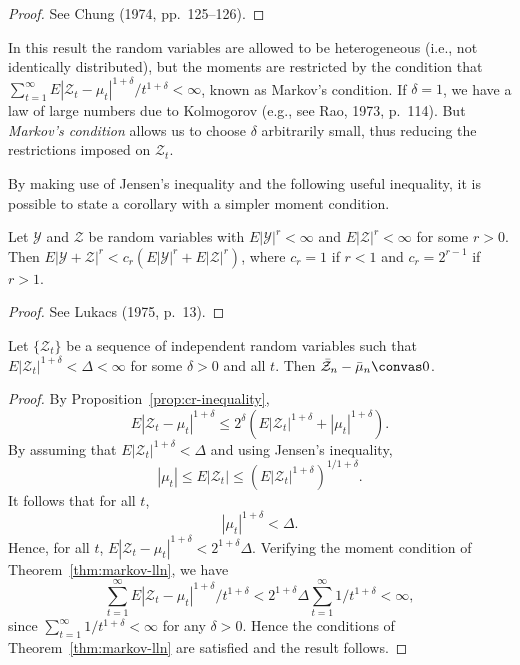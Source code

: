 \begin{proof}
See Chung (1974, pp.~125--126). \qedhere
\end{proof}

In this result the random variables are allowed to be heterogeneous (i.e., not identically distributed), but the moments are restricted by the condition that $\sum_{t=1}^{\infty} E|\mathcal{Z}_t - \mu_t|^{1+\delta}/t^{1+\delta} < \infty$, known as Markov's condition. If $\delta = 1$, we have a law of large numbers due to Kolmogorov (e.g., see Rao, 1973, p.~114). But \emph{Markov's condition} allows us to choose $\delta$ arbitrarily small, thus reducing the restrictions imposed on $\mathcal{Z}_t$.

By making use of Jensen's inequality and the following useful inequality, it is possible to state a corollary with a simpler moment condition.

\begin{proposition}\label{prop:cr-inequality}
Let $\mathcal{Y}$ and $\mathcal{Z}$ be random variables with $E|\mathcal{Y}|^r < \infty$ and $E|\mathcal{Z}|^r < \infty$ for some $r > 0$. Then $E|\mathcal{Y} + \mathcal{Z}|^r < c_r(E|\mathcal{Y}|^r + E|\mathcal{Z}|^r)$, where $c_r = 1$ if $r < 1$ and $c_r = 2^{r-1}$ if $r > 1$.
\end{proposition}

\begin{proof}
See Lukacs (1975, p.~13). \qedhere
\end{proof}

\begin{corollary}\label{cor:markov-simple}
Let $\{\mathcal{Z}_t\}$ be a sequence of independent random variables such that $E|\mathcal{Z}_t|^{1+\delta} < \Delta < \infty$ for some $\delta > 0$ and all $t$. Then $\bar{\mathcal{Z}}_n - \bar{\mu}_n \convas 0$.
\end{corollary}

\begin{proof}
By Proposition~\ref{prop:cr-inequality},
\[
E|\mathcal{Z}_t - \mu_t|^{1+\delta} \leq 2^{\delta}(E|\mathcal{Z}_t|^{1+\delta} + |\mu_t|^{1+\delta}).
\]
By assuming that $E|\mathcal{Z}_t|^{1+\delta} < \Delta$ and using Jensen's inequality,
\[
|\mu_t| \leq E|\mathcal{Z}_t| \leq (E|\mathcal{Z}_t|^{1+\delta})^{1/1+\delta}.
\]
It follows that for all $t$,
\[
|\mu_t|^{1+\delta} < \Delta.
\]
Hence, for all $t$, $E|\mathcal{Z}_t - \mu_t|^{1+\delta} < 2^{1+\delta} \Delta$. Verifying the moment condition of Theorem~\ref{thm:markov-lln}, we have
\[
\sum_{t=1}^{\infty} E|\mathcal{Z}_t - \mu_t|^{1+\delta}/t^{1+\delta} < 2^{1+\delta} \Delta \sum_{t=1}^{\infty} 1/t^{1+\delta} < \infty,
\]
since $\sum_{t=1}^{\infty} 1/t^{1+\delta} < \infty$ for any $\delta > 0$. Hence the conditions of Theorem~\ref{thm:markov-lln} are satisfied and the result follows. \qedhere
\end{proof}

